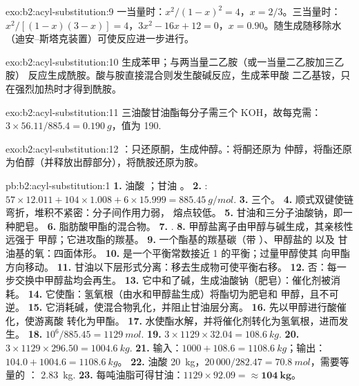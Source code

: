 \begin{solution}{exo:b2:acyl-substitution:9}
一当量时：$x^2/(1 - x)^2 = 4$，$x = 2/3$。三当量时：$x^2/[(1 - x)(3 - x)] = 4$，$3x^2 - 16x
+ 12 = 0$，$x = 0.90$。随生成随移除水（迪安–斯塔克装置）可使反应进一步进行。
\end{solution}

\begin{solution}{exo:b2:acyl-substitution:10}
 生成苯甲；与两当量二乙胺（或一当量二乙胺加三乙胺）
反应生成酰胺。酸与胺直接混合则发生酸碱反应，生成苯甲酸
二乙基铵，只在强烈加热时才得到酰胺。
\end{solution}

\begin{solution}{exo:b2:acyl-substitution:11}
三油酸甘油酯每分子需三个 KOH，故每克需：$3 \times 56.11/885.4 = \qty{0.190}{g}$，值为
190.
\end{solution}

\begin{solution}{exo:b2:acyl-substitution:12}
：只还原酮，生成仲醇。：将酮还原为
仲醇，将酯还原为伯醇（并释放出醇部分），将酰胺还原为胺。
\end{solution}

\begin{solution}{pb:b2:acyl-substitution:1}
\textbf{1.} 油酸 ；甘油 。
\textbf{2.} : $57 \times 12.011 + 104 \times 1.008 + 6 \times 15.999 = \qty{885.45}{g/mol}$.
\textbf{3.} 三个。
\textbf{4.} 顺式双键使链弯折，堆积不紧密：分子间作用力弱，
熔点较低。
\textbf{5.} 甘油和三分子油酸钠，即一种肥皂。
\textbf{6.} 脂肪酸甲酯的混合物。
\textbf{7.} .
\textbf{8.} 甲醇盐离子由甲醇与碱生成，其亲核性远强于
甲醇；它进攻酯的羰基。
\textbf{9.} 一个酯基的羰基碳（带 ）、甲醇盐的  以及
甘油基的氧：四面体形。
\textbf{10.} 是一个平衡常数接近 1 的平衡；过量甲醇使其
向甲酯方向移动。
\textbf{11.} 甘油以下层形式分离：移去生成物可使平衡右移。
\textbf{12.} 否：每一步交换中甲醇盐均会再生。
\textbf{13.} 它中和了碱，生成油酸钠（肥皂）：催化剂被消耗。
\textbf{14.} 它使酯：氢氧根（由水和甲醇盐生成）将酯切为肥皂和
甲醇，且不可逆。
\textbf{15.} 它消耗碱，使混合物乳化，并阻止甘油层分离。
\textbf{16.} 先以甲醇进行酸催化，使游离酸
转化为甲酯。
\textbf{17.} 水使酯水解，并将催化剂转化为氢氧根，进而发生。
\textbf{18.} $10^6/885.45 = \qty{1129}{mol}$.
\textbf{19.} $3 \times 1129 \times 32.04 = \qty{108.6}{kg}$.
\textbf{20.} $3 \times 1129 \times 296.50 = \qty{1004.6}{kg}$.
\textbf{21.} 输入：$1000 + 108.6 = \qty{1108.6}{kg}$；输出：$104.0 + 1004.6 = \qty{1108.6}{kg}$。
\textbf{22.} 油酸 \qty{20}{kg}，$20\,000/282.47 = \qty{70.8}{mol}$，需要等量的 ：
\qty{2.83}{kg}.
\textbf{23.} 每吨油脂可得甘油：$1129 \times 92.09 = \boldsymbol{\approx \qty{104}{kg}}$。
\end{solution}
